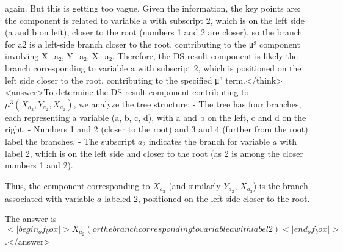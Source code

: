 again. But this is getting too vague. Given the information, the key points are: the component is related to variable a with subscript 2, which is on the left side (a and b on left), closer to the root (numbers 1 and 2 are closer), so the branch for a2 is a left-side branch closer to the root, contributing to the μ³ component involving X_a₂, Y_a₂, X_a₂. Therefore, the DS result component is likely the branch corresponding to variable a with subscript 2, which is positioned on the left side closer to the root, contributing to the specified μ³ term.</think><answer>To determine the DS result component contributing to \( \mu^3(X_{a_2}, Y_{a_2}, X_{a_2}) \), we analyze the tree structure:  
- The tree has four branches, each representing a variable (a, b, c, d), with a and b on the left, c and d on the right.  
- Numbers 1 and 2 (closer to the root) and 3 and 4 (further from the root) label the branches.  
- The subscript \( a_2 \) indicates the branch for variable \( a \) with label 2, which is on the left side and closer to the root (as 2 is among the closer numbers 1 and 2).  

Thus, the component corresponding to \( X_{a_2} \) (and similarly \( Y_{a_2} \), \( X_{a_2} \)) is the branch associated with variable \( a \) labeled 2, positioned on the left side closer to the root.  

The answer is \(<|begin_of_box|>X_{a_2} (or the branch corresponding to variable a with label 2)<|end_of_box|>\).</answer>